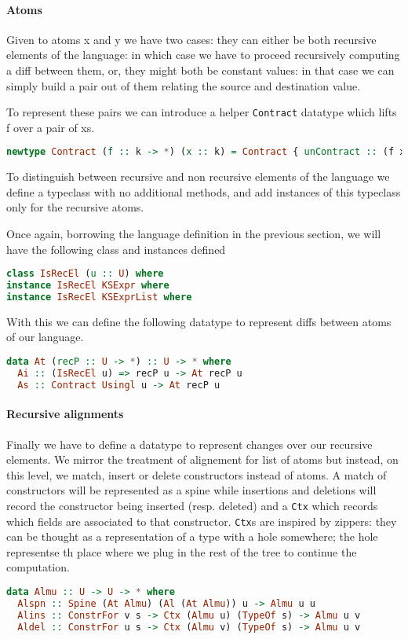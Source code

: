 \documentclass[11pt]{article}
\begin{document}
\paragraph{Atoms}\label{atoms}

Given to atoms x and y we have two cases: they can either be both recursive elements 
of the language: in which case we have to proceed recursively computing a diff 
between them, or, they might both be constant values: in that case we can simply 
build a pair out of them relating the source and destination value.

To represent these pairs we can introduce a helper \texttt{Contract} datatype which 
lifts f over a pair of xs.

\begin{lstlisting}[language=haskell]
  newtype Contract (f :: k -> *) (x :: k) = Contract { unContract :: (f x , f x) }
\end{lstlisting}

To distinguish between recursive and non recursive elements of the language we 
define a typeclass with no additional methods, and add instances of this typeclass only for the recursive atoms.

Once again, borrowing the language definition in the previous section, we will have the following 
class and instances defined
\begin{lstlisting}[language=haskell]
class IsRecEl (u :: U) where
instance IsRecEl KSExpr where
instance IsRecEl KSExprList where
\end{lstlisting}

With this we can define the following datatype to represent diffs between atoms of our language.
\begin{lstlisting}[language=haskell]
data At (recP :: U -> *) :: U -> * where
  Ai :: (IsRecEl u) => recP u -> At recP u
  As :: Contract Usingl u -> At recP u
\end{lstlisting}
\paragraph{Recursive alignments}\label{recursive alignments}

Finally we have to define a datatype to represent changes over our recursive 
elements. We mirror the treatment of alignement for list of atoms but instead, on this level, we 
match, insert or delete constructors instead of atoms. 
A match of constructors will be represented as a spine while insertions and 
deletions will record the constructor being inserted (resp. deleted) and a 
\texttt{Ctx} which records which fields are associated to that constructor.
\texttt{Ctx}s are inspired by zippers: they can be thought as a representation 
of a  type with a hole somewhere; the hole representse th place where we 
plug in the rest of the tree to continue the computation.
\begin{lstlisting}[language=haskell]
data Almu :: U -> U -> * where
  Alspn :: Spine (At Almu) (Al (At Almu)) u -> Almu u u
  Alins :: ConstrFor v s -> Ctx (Almu u) (TypeOf s) -> Almu u v
  Aldel :: ConstrFor u s -> Ctx (Almu v) (TypeOf s) -> Almu u v
\end{lstlisting}
\
\end{document}
